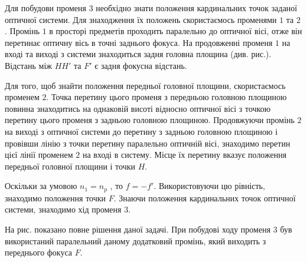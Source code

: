 \begin{solutionexample}

	Для побудови променя $3$ необхідно знати положення кардинальних точок заданої оптичної системи. Для знаходження їх положень скористаємось променями $1$ та $2$. Промінь $1$ в просторі предметів проходить паралельно до оптичної вісі, отже він перетинає оптичну вісь в точні заднього фокуса. На продовженні променя $1$ на вході та виході з системи знаходиться задня головна площина (див. рис.). Відстань між $HH'$ та $F'$ є задня фокусна відстань.

    \begin{center}
        
    \end{center}

	Для того, щоб знайти положення передньої головної площини, скористаємось променем $2$. Точка перетину цього променя з передньою головною площиною повинна знаходитись на однаковій висоті відносно оптичної вісі з точкою перетину цього променя з задньою головною площиною. Продовжуючи промінь $2$ на виході з оптичної системи до перетину з задньою головною площиною і провівши лінію з точки перетину паралельно оптичній вісі, знаходимо перетин цієї лінії променем $2$ на вході в систему. Місце їх перетину вказує положення передньої головної площини і точки $H$.

	Оскільки за умовою $n_1 = n_p$ , то $f = - f'$. Використовуючи цю рівність, знаходимо положення точки $F$. Знаючи положення кардинальних точок
	оптичної системи, знаходимо хід променя $3$.

	На рис. показано повне рішення даної задачі. При побудові ходу променя $3$ був використаний паралельний даному додатковий промінь, який виходить з переднього фокуса $F$.

\end{solutionexample}
